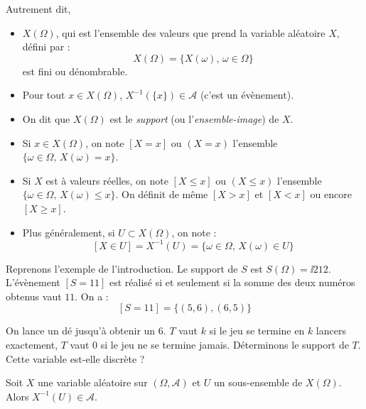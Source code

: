 \documentclass[french,11pt,twoside]{VcCours}
\begin{document}
Autrement dit,
\begin{itemize}
\item $X(\Omega)$, qui est l'ensemble des valeurs que prend la variable aléatoire $X$, défini par :
$$  X(\Omega) = \{X(\omega), \, \omega \in \Omega\} $$
est fini ou dénombrable.
\item Pour tout $x \in X(\Omega)$, $X^{-1}(\lbrace x \rbrace) \in \mathcal{A}$ (c'est un évènement).
\end{itemize}

\medskip

\begin{Notation}{}
\begin{itemize}
  \item On dit que $X(\Omega)$ est le \emph{support} (ou l'\emph{ensemble-image}) de $X$.
  \item Si $x \in X(\Omega)$, on note $[X = x]$ ou $(X=x)$ l'ensemble $\lbrace \omega \in \Omega, \, X(\omega)=x \rbrace$.
  \item Si $X$ est à valeurs réelles, on note $[X \leq x]$ ou $(X \leq x)$ l'ensemble $\lbrace \omega \in \Omega, \, X(\omega) \leq x \rbrace$. On définit de même $[X>x]$ et $[X<x]$ ou encore $[X \geq x]$.
  \item Plus généralement, si $U \subset X(\Omega)$, on note :
  $$[X\in U] = X^{-1}(U)= \lbrace \omega \in \Omega, \, X(\omega) \in U \rbrace$$
\end{itemize}
\end{Notation}

\begin{Exemple}{} Reprenons l'exemple de l'introduction. Le support de $S$ est $S(\Omega) = \ii{2}{12}$. L'évènement $[S=11]$ est réalisé si et seulement si la somme des deux numéros obtenus vaut $11$. On a :
\[ [S=11] = \lbrace (5,6), (6,5) \rbrace\]
\end{Exemple}

\begin{Exemple}{} On lance un dé jusqu'à obtenir un 6. $T$ vaut $k$ si le jeu se termine en $k$ lancers exactement, $T$ vaut 0 si le jeu ne se termine jamais. Déterminons le support de $T$. Cette variable est-elle discrète ?

\vspace{2cm}
\end{Exemple}

\begin{Proposition}{} Soit $X$ une variable aléatoire sur $(\Omega, \mathcal{A})$ et $U$ un sous-ensemble de $X(\Omega)$. Alors $X^{-1}(U) \in \mathcal{A}$.
\end{Proposition}
\end{document}
